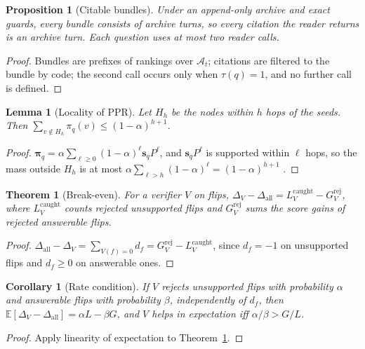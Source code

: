 \documentclass[10pt]{article}
\theoremstyle{plain}
\newtheorem{proposition}{Proposition}
\newtheorem{lemma}{Lemma}
\newtheorem{theorem}{Theorem}
\newtheorem{corollary}{Corollary}
\newcommand{\A}{\mathcal{A}}
\begin{document}
\begin{proposition}[Citable bundles]\label{prop:projection}
Under an append-only archive and exact guards, every bundle consists of archive turns, so every citation the
reader returns is an archive turn. Each question uses at most two reader calls.
\end{proposition}
\begin{proof}
Bundles are prefixes of rankings over $\A_t$; citations are filtered to the bundle by code; the second call
occurs only when $\tau(q)=1$, and no further call is defined.
\end{proof}

\begin{lemma}[Locality of PPR]\label{lem:ppr}
Let $H_h$ be the nodes within $h$ hops of the seeds. Then $\sum_{v\notin H_h}\pi_q(v)\le(1-\alpha)^{h+1}$.
\end{lemma}
\begin{proof}
$\boldsymbol\pi_q=\alpha\sum_{\ell\ge0}(1-\alpha)^{\ell}\mathbf{s}_qP^{\ell}$, and $\mathbf{s}_qP^{\ell}$ is supported
within $\ell$ hops, so the mass outside $H_h$ is at most $\alpha\sum_{\ell>h}(1-\alpha)^{\ell}=(1-\alpha)^{h+1}$
\citep{andersen2006local}.
\end{proof}

\begin{theorem}[Break-even]\label{thm:breakeven}
For a verifier $V$ on flips, $\Delta_V-\Delta_{\mathrm{all}}=L^{\mathrm{caught}}_V-G^{\mathrm{rej}}_V$, where
$L^{\mathrm{caught}}_V$ counts rejected unsupported flips and $G^{\mathrm{rej}}_V$ sums the score gains of rejected
answerable flips.
\end{theorem}
\begin{proof}
$\Delta_{\mathrm{all}}-\Delta_V=\sum_{V(f)=0}d_f=G^{\mathrm{rej}}_V-L^{\mathrm{caught}}_V$, since $d_f=-1$ on unsupported
flips and $d_f\ge0$ on answerable ones.
\end{proof}

\begin{corollary}[Rate condition]\label{cor:rate}
If $V$ rejects unsupported flips with probability $\alpha$ and answerable flips with probability $\beta$,
independently of $d_f$, then $\mathbb{E}[\Delta_V-\Delta_{\mathrm{all}}]=\alpha L-\beta G$, and $V$ helps in
expectation iff $\alpha/\beta>G/L$.
\end{corollary}
\begin{proof}
Apply linearity of expectation to Theorem~\ref{thm:breakeven}.
\end{proof}
\end{document}
